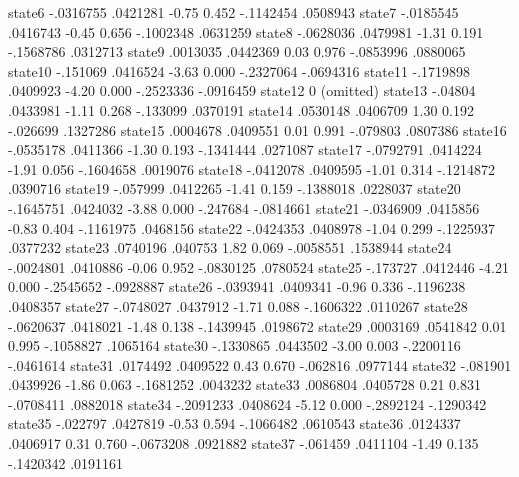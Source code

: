       state6 {\VBAR}  -.0316755   .0421281    -0.75   0.452    -.1142454    .0508943
      state7 {\VBAR}  -.0185545   .0416743    -0.45   0.656    -.1002348    .0631259
      state8 {\VBAR}  -.0628036   .0479981    -1.31   0.191    -.1568786    .0312713
      state9 {\VBAR}   .0013035   .0442369     0.03   0.976    -.0853996    .0880065
     state10 {\VBAR}   -.151069   .0416524    -3.63   0.000    -.2327064   -.0694316
     state11 {\VBAR}  -.1719898   .0409923    -4.20   0.000    -.2523336   -.0916459
     state12 {\VBAR}          0  (omitted)
     state13 {\VBAR}    -.04804   .0433981    -1.11   0.268     -.133099    .0370191
     state14 {\VBAR}   .0530148   .0406709     1.30   0.192     -.026699    .1327286
     state15 {\VBAR}   .0004678   .0409551     0.01   0.991     -.079803    .0807386
     state16 {\VBAR}  -.0535178   .0411366    -1.30   0.193    -.1341444    .0271087
     state17 {\VBAR}  -.0792791   .0414224    -1.91   0.056    -.1604658    .0019076
     state18 {\VBAR}  -.0412078   .0409595    -1.01   0.314    -.1214872    .0390716
     state19 {\VBAR}   -.057999   .0412265    -1.41   0.159    -.1388018    .0228037
     state20 {\VBAR}  -.1645751   .0424032    -3.88   0.000     -.247684   -.0814661
     state21 {\VBAR}  -.0346909   .0415856    -0.83   0.404    -.1161975    .0468156
     state22 {\VBAR}  -.0424353   .0408978    -1.04   0.299    -.1225937    .0377232
     state23 {\VBAR}   .0740196    .040753     1.82   0.069    -.0058551    .1538944
     state24 {\VBAR}  -.0024801   .0410886    -0.06   0.952    -.0830125    .0780524
     state25 {\VBAR}   -.173727   .0412446    -4.21   0.000    -.2545652   -.0928887
     state26 {\VBAR}  -.0393941   .0409341    -0.96   0.336    -.1196238    .0408357
     state27 {\VBAR}  -.0748027   .0437912    -1.71   0.088    -.1606322    .0110267
     state28 {\VBAR}  -.0620637   .0418021    -1.48   0.138    -.1439945    .0198672
     state29 {\VBAR}   .0003169   .0541842     0.01   0.995    -.1058827    .1065164
     state30 {\VBAR}  -.1330865   .0443502    -3.00   0.003    -.2200116   -.0461614
     state31 {\VBAR}   .0174492   .0409522     0.43   0.670     -.062816    .0977144
     state32 {\VBAR}   -.081901   .0439926    -1.86   0.063    -.1681252    .0043232
     state33 {\VBAR}   .0086804   .0405728     0.21   0.831    -.0708411    .0882018
     state34 {\VBAR}  -.2091233   .0408624    -5.12   0.000    -.2892124   -.1290342
     state35 {\VBAR}   -.022797   .0427819    -0.53   0.594    -.1066482    .0610543
     state36 {\VBAR}   .0124337   .0406917     0.31   0.760    -.0673208    .0921882
     state37 {\VBAR}   -.061459   .0411104    -1.49   0.135    -.1420342    .0191161
